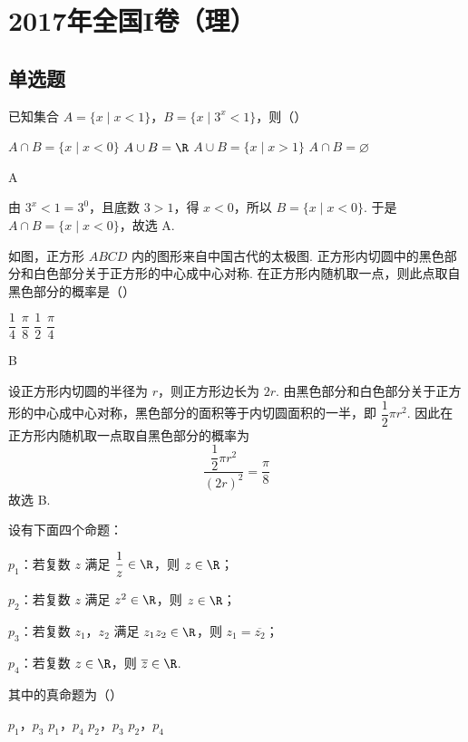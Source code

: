 \chapter{2017年全国I卷（理）}

\section{单选题}

\begin{problem}
已知集合 \(A=\{x\mid x<1\}\)，\(B=\{x\mid 3^x<1\}\)，则（\quad）

\choices
    {\(A\cap B=\{x\mid x<0\}\)}
    {\(A\cup B=\R\)}
    {\(A\cup B=\{x\mid x>1\}\)}
    {\(A\cap B=\varnothing\)}
\end{problem}

\begin{answer}
A
\end{answer}

\begin{solution}
由 \(3^x<1=3^0\)，且底数 \(3>1\)，得 \(x<0\)，所以 \(B=\{x\mid x<0\}\). 于是 \(A\cap B=\{x\mid x<0\}\)，故选 A.
\end{solution}

\begin{problem}
如图，正方形 \(ABCD\) 内的图形来自中国古代的太极图. 正方形内切圆中的黑色部分和白色部分关于正方形的中心成中心对称. 在正方形内随机取一点，则此点取自黑色部分的概率是（\quad）


\choices
    {\(\dfrac14\)}
    {\(\dfrac{\pi}{8}\)}
    {\(\dfrac12\)}
    {\(\dfrac{\pi}{4}\)}
\end{problem}

\begin{answer}
B
\end{answer}

\begin{solution}
设正方形内切圆的半径为 \(r\)，则正方形边长为 \(2r\). 由黑色部分和白色部分关于正方形的中心成中心对称，黑色部分的面积等于内切圆面积的一半，即 \(\dfrac12\pi r^2\). 因此在正方形内随机取一点取自黑色部分的概率为
\[
\frac{\dfrac12\pi r^2}{(2r)^2}=\frac{\pi}{8}
\]
故选 B.
\end{solution}

\begin{problem}
设有下面四个命题：

\begin{circlelist}
\item \(p_1\)：若复数 \(z\) 满足 \(\dfrac1z\in\R\)，则 \(z\in\R\)；
\item \(p_2\)：若复数 \(z\) 满足 \(z^2\in\R\)，则 \(z\in\R\)；
\item \(p_3\)：若复数 \(z_1\)，\(z_2\) 满足 \(z_1z_2\in\R\)，则 \(z_1=\overline{z_2}\)；
\item \(p_4\)：若复数 \(z\in\R\)，则 \(\overline z\in\R\).
\end{circlelist}

其中的真命题为（\quad）

\choices
    {\(p_1\)，\(p_3\)}
    {\(p_1\)，\(p_4\)}
    {\(p_2\)，\(p_3\)}
    {\(p_2\)，\(p_4\)}
\end{problem}

